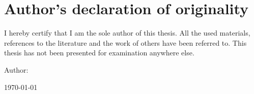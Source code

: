 \section*{\centering Author's declaration of originality}
I hereby certify that I am the sole author of this thesis. All the
used materials, references to the literature and the work of others
have been referred to. This thesis has not been presented for
examination anywhere else.

Author: \nameofauthor

\today
\pagebreak
